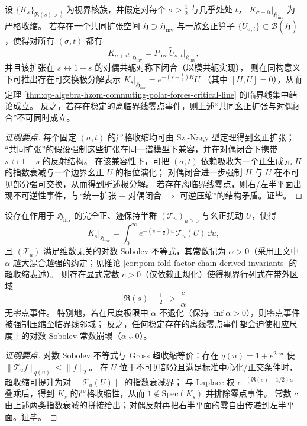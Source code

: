 \begin{proposition}\label{prop:op-algebra-common-unitary-dilation-criterion}
设 \(\{K_s\}_{\Re(s)>\tfrac12}\) 为视界核族，并假定对每个 \(\sigma>\tfrac12\) 与几乎处处 \(t\)，
\(
K_{\sigma+it}\big|_{\mathfrak{H}_{\mathrm{inv}}}
\)
为严格收缩。
若存在一个共同扩张空间 \(\widetilde{\mathfrak H}\supset\mathfrak{H}_{\mathrm{inv}}\) 与一族幺正算子 \(\{\widetilde U_{\sigma,t}\}\subset\mathcal{B}(\widetilde{\mathfrak H})\)，使得对所有 \((\sigma,t)\) 都有
\[
K_{\sigma+it}\big|_{\mathfrak{H}_{\mathrm{inv}}}
=P_{\mathrm{inv}}\,\widetilde U_{\sigma,t}\big|_{\mathfrak{H}_{\mathrm{inv}}},
\]
并且该扩张在 \(s\leftrightarrow 1-s\) 的对偶共轭对称下闭合（以模共轭实现），
则在同构意义下可推出存在可交换极分解表示
\(
K_s\big|_{\mathfrak{H}_{\mathrm{inv}}}=e^{-(s-\tfrac12)H}U
\)
（其中 \([H,U]=0\)），从而定理 \ref{thm:op-algebra-hzom-commuting-polar-forces-critical-line} 的临界线集中结论成立。
反之，若存在稳定的离临界线零点事件，则上述“共同幺正扩张与对偶闭合”不可同时成立。
\end{proposition}
\begin{proof}[证明要点]
每个固定 \((\sigma,t)\) 的严格收缩均可由 Sz.-Nagy 型定理得到幺正扩张；
“共同扩张”的假设强制这些扩张在同一谱模型下兼容，并在对偶闭合下携带 \(s\leftrightarrow 1-s\) 的反射结构。
在该兼容性下，可把 \((\sigma,t)\)-依赖吸收为一个正生成元 \(H\) 的指数衰减与一个边界幺正 \(U\) 的相位演化；
对偶闭合进一步强制 \(H\) 与 \(U\) 在不可见部分强可交换，从而得到所述极分解。
若存在离临界线零点，则右/左半平面出现不可逆性事件，与“统一扩张 + 对偶闭合 \(\Rightarrow\) 可逆压缩”的结构矛盾。证毕。
\end{proof}

\begin{proposition}\label{prop:op-algebra-logsobolev-zero-band}
设存在作用于 \(\mathfrak{H}_{\mathrm{inv}}\) 的完全正、迹保持半群 \((\mathcal{T}_u)_{u\ge 0}\) 与幺正扰动 \(U\)，使得
\[
K_s\big|_{\mathfrak{H}_{\mathrm{inv}}}
=\int_{0}^{\infty}e^{-(s-\tfrac12)u}\,\mathcal{T}_u(U)\,\dd u,
\]
且 \((\mathcal{T}_u)\) 满足维数无关的对数 Sobolev 不等式，其常数记为 \(\alpha>0\)（采用正文中 \(\alpha\) 越大混合越强的约定；见推论 \ref{cor:pom-fold-factor-chain-derived-invariants} 的超收缩表述）。
则存在显式常数 \(c>0\)（仅依赖正规化）使得视界行列式在带外区域
\[
|\Re(s)-\tfrac12|\ >\ \frac{c}{\alpha}
\]
无零点事件。
特别地，若在尺度极限中 \(\alpha\) 不退化（保持 \(\inf \alpha>0\)），则零点事件被强制压缩至临界线邻域；
反之，任何稳定存在的离线零点事件都会迫使相应尺度上的对数 Sobolev 常数崩塌（\(\alpha\downarrow 0\)）。
\end{proposition}
\begin{proof}[证明要点]
对数 Sobolev 不等式与 Gross 超收缩等价：存在 \(q(u)=1+e^{2\alpha u}\) 使 \(\|\mathcal{T}_u f\|_{q(u)}\le \|f\|_2\)。
在 \(U\) 位于不可见部分且满足标准中心化/正交条件时，超收缩可提升为对 \(\|\mathcal{T}_u(U)\|\) 的指数衰减界；
与 Laplace 权 \(e^{-(\Re(s)-1/2)u}\) 叠乘后，得到 \(K_s\) 的严格收缩性，从而 \(1\notin\mathrm{Spec}(K_s)\) 并排除零点事件。
常数 \(c\) 由上述两类指数衰减的拼接给出；对偶反射再把右半平面的零自由传递到左半平面。证毕。
\end{proof}

\endinput
